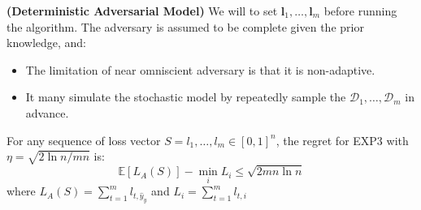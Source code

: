 \begin{definition}{\textbf{(Deterministic Adversarial Model)}}
    We will to set $\boldsymbol l_1,\dots,\boldsymbol l_m$ before running the algorithm. The adversary is assumed to be complete given the prior knowledge, and:
    \begin{itemize}
        \item The limitation of near omniscient adversary is that it is non-adaptive. 
        \item It many simulate the stochastic model by repeatedly sample the $\mathcal{D}_1,\dots,\mathcal{D}_m$ in advance.
    \end{itemize} 
\end{definition}

\begin{theorem}
    For any sequence of loss vector $S = l_1,\dots,l_m \in [0, 1]^n$, the regret for EXP3 with $\eta = \sqrt{2\ln n/mn}$ is:
    \begin{equation*}
        \mathbb{E}[L_A(S)] - \min_i L_i \le \sqrt{2mn\ln n}
    \end{equation*}
    where $L_A(S) = \sum^m_{t=1}l_{t, \hat{y}_y}$ and $L_i = \sum^m_{t=1}l_{t, i}$
\end{theorem}
